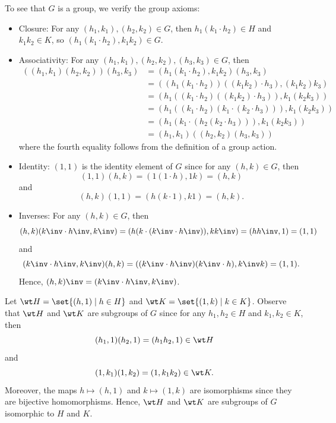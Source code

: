 \begin{proofnum}
    \item To see that $G$ is a group, we verify the group axioms:
    \begin{itemize}
        \item Closure: For any $(h_1, k_1), (h_2, k_2) \in G$, then $h_1 (k_1 \cdot h_2) \in H$ and $k_1 k_2 \in K$, so $(h_1 (k_1 \cdot h_2), k_1 k_2) \in G$.
        \item Associativity: For any $(h_1, k_1), (h_2, k_2), (h_3, k_3) \in G$, then
        \begin{align*}
            ((h_1, k_1)(h_2, k_2))(h_3, k_3) &= (h_1 (k_1 \cdot h_2), k_1 k_2)(h_3, k_3) \\
            &= ((h_1 (k_1 \cdot h_2)) ((k_1 k_2) \cdot h_3), (k_1 k_2) k_3) \\
            &= (h_1 ((k_1 \cdot h_2) ((k_1 k_2) \cdot h_3)), k_1 (k_2 k_3)) \\
            &= (h_1 ((k_1 \cdot h_2) (k_1 \cdot (k_2 \cdot h_3))), k_1 (k_2 k_3)) \\
            &= (h_1 (k_1 \cdot (h_2 (k_2 \cdot h_3))), k_1 (k_2 k_3)) \\
            &= (h_1, k_1)((h_2, k_2)(h_3, k_3))
        \end{align*}
        where the fourth equality follows from the definition of a group action.
        \item Identity: $(1, 1)$ is the identity element of $G$ since for any $(h, k) \in G$, then
        \[(1, 1)(h, k) = (1 (1 \cdot h), 1 k) = (h, k)\]
        and
        \[(h, k)(1, 1) = (h (k \cdot 1), k 1) = (h, k).\]
        \item Inverses: For any $(h, k) \in G$, then
        \[(h, k)(k\inv \cdot h\inv, k\inv) = (h (k \cdot (k\inv \cdot h\inv)), k k\inv) = (h h\inv, 1) = (1, 1)\]
        and
        \[(k\inv \cdot h\inv, k\inv)(h, k) = ((k\inv \cdot h\inv) (k\inv \cdot h), k\inv k) = (1, 1).\]
        Hence, $(h, k)\inv = (k\inv \cdot h\inv, k\inv)$.
    \end{itemize}
    \item Let $\wt H = \set{(h, 1) \mid h \in H}$ and $\wt K = \set{(1, k) \mid k \in K}$. Observe that $\wt H$ and $\wt K$ are subgroups of $G$ since for any $h_1, h_2 \in H$ and $k_1, k_2 \in K$, then
    \[(h_1, 1)(h_2, 1) = (h_1 h_2, 1) \in \wt H\]
    and
    \[(1, k_1)(1, k_2) = (1, k_1 k_2) \in \wt K.\]
    Moreover, the maps $h \mapsto (h, 1)$ and $k \mapsto (1, k)$ are isomorphisms since they are bijective homomorphisms. Hence, $\wt H$ and $\wt K$ are subgroups of $G$ isomorphic to $H$ and $K$.

\end{proofnum}
